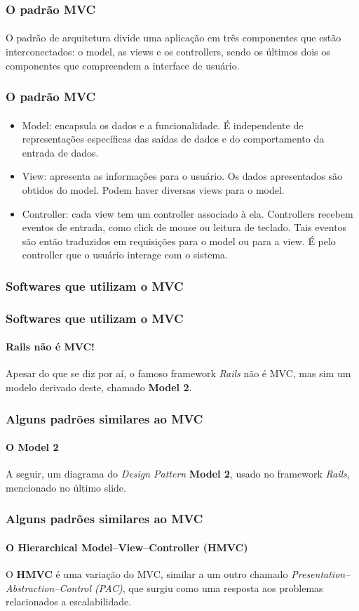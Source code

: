 \documentclass{beamer}
\begin{document}
\begin{frame}
\frametitle{O padrão MVC}
\framesubtitle{}
	O padrão de arquitetura divide uma aplicação em três componentes que estão interconectados: o model, as views e os controllers, sendo os últimos dois os componentes que compreendem a interface de usuário.
\end{frame}

\begin{frame}
\frametitle{O padrão MVC}
\framesubtitle{}
\begin{itemize}
	\item Model: encapsula os dados e a funcionalidade. É independente de representações específicas das saídas de dados e do comportamento da entrada de dados.
	\item View: apresenta as informações para o usuário. Os dados apresentados são obtidos do model. Podem haver diversas views para o model.
	\item Controller: cada view tem um controller associado à ela. Controllers recebem eventos de entrada, como click de mouse ou leitura de teclado. Tais eventos são então traduzidos em requisições para o model ou para a view. É pelo controller que o usuário interage com o sistema.
\end{itemize}
\end{frame}

\begin{frame}
\frametitle{Softwares que utilizam o MVC}
\framesubtitle{}
\end{frame}

\begin{frame}
\frametitle{Softwares que utilizam o MVC}
\framesubtitle{Rails não é MVC!}
	Apesar do que se diz por aí, o famoso framework \textit{Rails} não é MVC, mas sim um modelo derivado deste, chamado \textbf{Model 2}. 
\end{frame}
\begin{frame}
\frametitle{Alguns padrões similares ao MVC}
\framesubtitle{O Model 2}
	A seguir, um diagrama do \textit{Design Pattern} \textbf{Model 2}, usado no framework \textit{Rails}, mencionado no último slide.
\end{frame}

\begin{frame}
\frametitle{Alguns padrões similares ao MVC}
\framesubtitle{O Hierarchical Model–View–Controller (HMVC)}
	O \textbf{HMVC} é uma variação do MVC, similar a um outro chamado \textit{Presentation–Abstraction–Control (PAC)}, que surgiu como uma resposta aos problemas
	relacionados a escalabilidade.
\end{frame}
\end{document}
